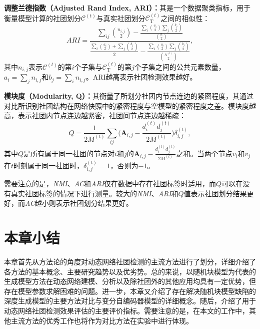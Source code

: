 \textbf{调整兰德指数（Adjusted Rand Index,  ARI）：}其是一个数据聚类指标，用于衡量模型计算的社团划分$\mathcal{C}^{(t)}$与真实社团划分$\mathcal{C}_{\mathrm{T}}^{(t)}$之间的相似性：
     \begin{equation}
      ARI = \dfrac{\sum_{ij}\binom{n_{i,j}}{2}-
      \frac{\sum_{i}\binom{a_{i}}{2} \sum_{j}\binom{b_{j}}{2}}{\binom{n}{2}}}{\frac{ \sum_{i}\binom{a_{i}}{2}+ \sum_{j}\binom{b_{j}}{2} }{2}-\frac{\sum_{i}\binom{a_{i}}{2} \sum_{j}\binom{b_{j}}{2}}{\binom{N^{(t)}}{2}}},
      \end{equation}
其中$n_{i,j}$表示$\mathcal{C}^{(t)}$的第$i$个子集与$\mathcal{C}_{\mathrm{T}}^{(t)}$的第$j$个子集之间的公共元素数量，$a_i = \sum_{j}n_{i,j}$和$b_j = \sum_{i}n_{i,j}$。ARI越高表示社团检测效果越好。

\textbf{模块度（Modularity, Q）：}其衡量了所划分社团内节点连边的紧密程度，其通过对比所识别社团结构在网络快照中的紧密程度与空模型的紧密程度之差。模块度越高，表示社团内节点连边越紧密，社团间节点连边越稀疏：
     \begin{equation}
       Q = \frac{1}{2M^{(t)}}\sum_{ij}\bigg( \mathbf{A}_{i,j}-\frac{d_{i}^{(t)}d_{j}^{(t)}}{2M^{(t)}} \bigg)\delta_{i,j}^{(t)} ,
      \end{equation}
其中$Q$是所有属于同一社团的节点对$i$和$j$的$ \mathbf{A}_{i,j}-\frac{d_{i}^{(t)}d_{j}^{(t)}}{2M^{(t)}}$之和。当两个节点$v_i$和$v_j$在$t$时刻属于同一社团时，$\delta_{i,j}^{(t)}=1$，否则为$-1$。

需要注意的是，\emph{NMI}、\emph{AC}和\emph{ARI}仅在数据中存在社团标签时适用，而$Q$可以在没有真实社团标签的情况下进行测量。较大的\emph{NMI}、\emph{ARI}和$Q$值表示社团划分结果更好，而\emph{AC}越小则表示社团划分结果更好。

\section{本章小结}
本章首先从方法论的角度对动态网络社团检测的主流方法进行了划分，详细介绍了各方法的基本概念、主要研究趋势以及优劣势。总的来说，以随机块模型为代表的生成模型方法在动态网络建模、分析以及除社团外的其他应用均具有一定优势，但存在模型参数求解困难的问题。进一步，本章又介绍了存在解决随机块模型缺陷的深度生成模型的主要方法对比与变分自编码器模型的详细概念。随后，介绍了用于动态网络社团检测效果评估的主要评价指标。需要注意的是，在本文的工作中，其他主流方法的优秀工作也将作为对比方法在实验中进行体现。

